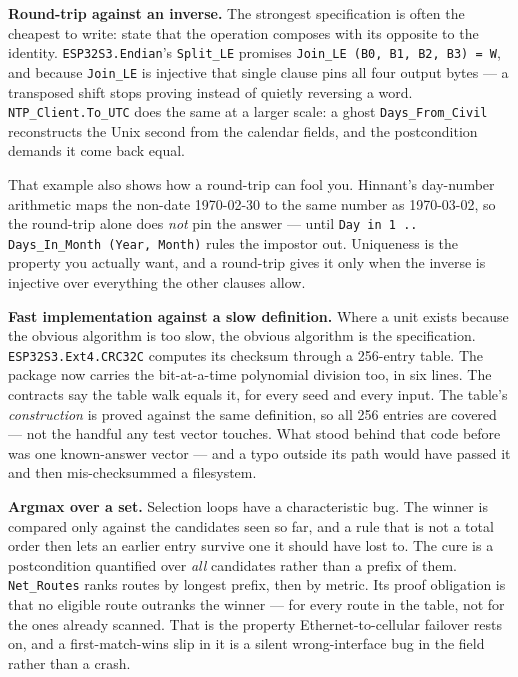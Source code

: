 \textbf{Round-trip against an inverse.} The strongest specification is often the
cheapest to write: state that the operation composes with its opposite to the identity.
\lstinline{ESP32S3.Endian}'s \lstinline{Split_LE} promises
\lstinline{Join_LE (B0, B1, B2, B3) = W}, and because \lstinline{Join_LE} is
injective that single clause pins all four output bytes --- a transposed shift stops
proving instead of quietly reversing a word. \lstinline{NTP_Client.To_UTC} does the
same at a larger scale: a ghost \lstinline{Days_From_Civil} reconstructs the Unix
second from the calendar fields, and the postcondition demands it come back equal.

That example also shows how a round-trip can fool you. Hinnant's day-number arithmetic
maps the non-date 1970-02-30 to the same number as 1970-03-02, so the round-trip alone
does \emph{not} pin the answer --- until \lstinline{Day in 1 .. Days_In_Month (Year, Month)}
rules the impostor out. Uniqueness is the property you actually want, and a round-trip
gives it only when the inverse is injective over everything the other clauses allow.

\textbf{Fast implementation against a slow definition.} Where a unit exists because
the obvious algorithm is too slow, the obvious algorithm is the specification.
\lstinline{ESP32S3.Ext4.CRC32C} computes its checksum through a 256-entry table. The
package now carries the bit-at-a-time polynomial division too, in six lines. The
contracts say the table walk equals it, for every seed and every input. The table's
\emph{construction} is proved against the same definition, so all 256 entries are
covered --- not the handful any test vector touches. What stood behind that code
before was one known-answer vector --- and a typo outside its path would have passed it
and then mis-checksummed a filesystem.

\textbf{Argmax over a set.} Selection loops have a characteristic bug. The winner is
compared only against the candidates seen so far, and a rule that is not a total order
then lets an earlier entry survive one it should have lost to. The cure is a
postcondition quantified over \emph{all} candidates rather than a prefix of them.
\lstinline{Net_Routes} ranks routes by longest prefix, then by metric. Its proof
obligation is that no eligible route outranks the winner --- for every route in the
table, not for the ones already scanned. That is the property Ethernet-to-cellular
failover rests on, and a first-match-wins slip in it is a silent wrong-interface bug in
the field rather than a crash.

